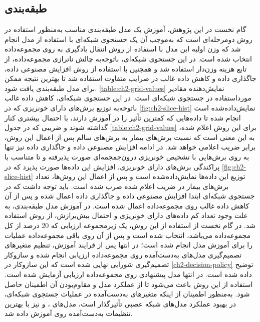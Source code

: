 \subsection{طبقه‌بندی}

گام نخست در این پژوهش، آموزش یک مدل طبقه‌بندی مناسب به‌منظور استفاده در روش دومرحله‌ای است که به‌موجب آن یک جستجوی شبکه‌ای 
با استفاده از مدل 
انجام شد که وزن‌ اولیه این مدل با استفاده از روش انتقال یادگیری به روی مجموعه‌داده 
\cite{deng2009imagenet}
انتخاب شده است. در این جستجوی شبکه‌ای،‌ باتوجه‌به چالش‌ ناترازی مجموعه‌داده، از تابع هزینه 
وزن‌دار استفاده شد و همچنین با استفاده از روش افزایش مصنوعی داده، جاگذاری داده
و کاهش داده غالب در ضرایب متفاوت استفاده شد تا بهترین نتیجه ممکن برای مدل طبقه‌بندی یافت شود. 
\autoref{table:ch2-grid-values}
نمایش‌دهنده مقادیر مورداستفاده در جستجوی شبکه‌ای است. در این جستجوی شبکه‌ای، کاهش داده غالب باتوجه‌به توزیع برش‌های دارای خونریزی که در 
\autoref{fig:ch2-slice-hist}
نمایش‌داده‌شده است انجام شده تا داده‌هایی که کمترین تأثیر  را در آموزش دارند،‌ با احتمال بیشتری کنار گذاشته شوند و ضریبی که در جدول 
\autoref{table:ch2-grid-values}
برای این روش اعلام شده،‌ به این معنی است که نسبت برش‌های بیمار به برش‌های سالم پس از اعمال این روش، برابر ضریب اعلامی خواهد شد.
در ادامه افزایش مصنوعی داده و جاگذاری داده نیز‌ تنها به روی برش‌هایی با تشخیص خونریزی درون‌جمجمه‌ای صورت پذیرفته و تا متناسب  با پراکندگی برش‌های دارای خونریزی، افزایش این داده‌ها صورت پذیرد که در 
\autoref{fig:ch2-slice-hist}
توزیع این داده‌ها نمایش‌داده‌شده است و پس از اعمال این روش‌ها، تعداد برش‌های بیمار در ضریب اعلام شده ضرب شده است. باید توجه داشت که در جستجوی شبکه‌ای ابتدا  افزایش مصنوعی داده و جاگذاری داده اعمال شده و پس از آن کاهش داده غالب روی مجموعه‌داده اعمال شده است.
در آموزش مدل طبقه‌بندی، به علت وجود تعداد کم داده‌های دارای خونریزی و احتمال بیش‌برازش،
از روش 
استفاده شد. در گام نخست از استفاده از این روش، یک زیرمجموعه ارزیابی
که 20 درصد از کل مجموعه‌داده می‌باشد، انتخاب شده ‌است و پس از آن روی باقی مجموعه‌داده عملیات
را برای آموزش مدل انجام شده است؛ در انتها پس از فرایند آموزش، تنظیم متغیرهای تصمیم‌گیری‌ مدل‌های به‌دست‌آمده روی مجموعه‌داده ارزیابی انجام شده و سازوکار تصمیم‌گیری شورایی
نهایی شده است که این سازوکار در 
\autoref{ch2-decision-policy}
توضیح داده شده است.
در انتها مدل پیشنهادی روی مجموعه‌داده ارزیابی آزمایش شده است. استفاده از این روش باعث می‌شود تا از عملکرد مدل و مقاوم‌بودن آن اطمینان حاصل شود. به‌منظور اطمینان از اینکه متغیرهای به‌دست‌آمده در عملیات جستجوی شبکه‌ای،‌ در بهبود عملکرد مدل‌های شبکه عصبی تأثیرگذار است، مدل‌های 
، و 
نیز با بهترین تنظیمات به‌دست‌آمده روی 
آموزش داده شد.

